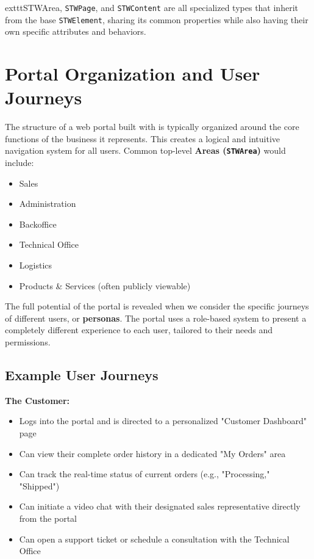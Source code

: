 	exttt{STWArea}, \texttt{STWPage}, and \texttt{STWContent} are all specialized types that inherit from the base \texttt{STWElement}, sharing its common properties while also having their own specific attributes and behaviors.

\section{Portal Organization and User Journeys}
\label{sec:user-journeys}

The structure of a web portal built with \wbdl{} is typically organized around the core functions of the business it represents. This creates a logical and intuitive navigation system for all users. Common top-level \textbf{Areas (\texttt{STWArea})} would include:

\begin{itemize}
	\item Sales
	\item Administration
	\item Backoffice
	\item Technical Office
	\item Logistics
	\item Products \& Services (often publicly viewable)
\end{itemize}

The full potential of the portal is revealed when we consider the specific journeys of different users, or \textbf{personas}. The portal uses a role-based system to present a completely different experience to each user, tailored to their needs and permissions.

\subsection{Example User Journeys}

\textbf{The Customer:}
\begin{itemize}
	\item Logs into the portal and is directed to a personalized "Customer Dashboard" page
	\item Can view their complete order history in a dedicated "My Orders" area
	\item Can track the real-time status of current orders (e.g., "Processing," "Shipped")
	\item Can initiate a video chat with their designated sales representative directly from the portal
	\item Can open a support ticket or schedule a consultation with the Technical Office
\end{itemize}

